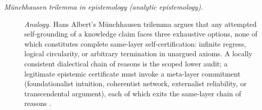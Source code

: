 \begin{description}
\item[\emph{M\"unchhausen trilemma in epistemology
(analytic epistemology).}] \textit{Analogy.}
Hans Albert's M\"unchhausen trilemma argues that any
attempted self-grounding of a knowledge claim faces
three exhaustive options, none of which constitutes
complete same-layer self-certification: infinite
regress, logical circularity, or arbitrary termination
in unargued axioms.  A locally consistent dialectical
chain of reasons is the scoped lower audit; a legitimate
epistemic certificate must invoke a meta-layer
commitment (foundationalist intuition, coherentist
network, externalist reliability, or transcendental
argument), each of which exits the same-layer chain of
reasons \citep{Albert1985TreatiseCriticalReason}.
\end{description}
\endgroup

